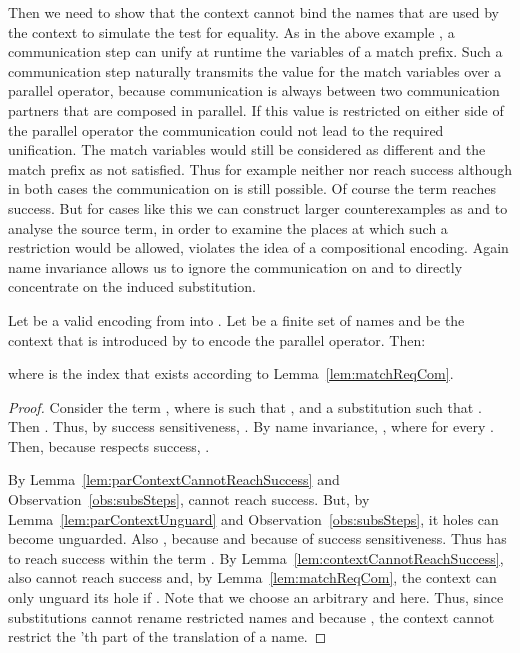 \documentclass[]{article}
\begin{document}
Then we need to show that the context  cannot bind the names that are used by the context  to simulate the test for equality. As in the above example , a communication step can unify at runtime the variables of a match prefix. Such a communication step naturally transmits the value for the match variables over a parallel operator, because communication is always between two communication partners that are composed in parallel. If this value is restricted on either side of the parallel operator the communication could not lead to the required unification. The match variables would still be considered as different and the match prefix as not satisfied. Thus for example neither  nor  reach success although in both cases the communication on  is still possible. Of course the term  reaches success. But for cases like this we can construct larger counterexamples as  and to analyse the source term, in order to examine the places at which such a restriction would be allowed, violates the idea of a compositional encoding. Again name invariance allows us to ignore the communication on  and to directly concentrate on the induced substitution.

\begin{lemma}
	\label{lem:parContextNotRes}
	Let \encod be a valid encoding from \piT into \piNM.
	Let  be a finite set of names
	and  be the context that is introduced by  to encode the parallel operator.
	Then:
	
	where  is the index that exists according to Lemma~\ref{lem:matchReqCom}.
\end{lemma}

\begin{proof}
	Consider the term , where  is such that , and a substitution  such that .
	Then . Thus, by success sensitiveness, .
	By name invariance, , where  for every .
	Then, because  respects success, .
	
	By Lemma~\ref{lem:parContextCannotReachSuccess} and Observation~\ref{obs:subsSteps},  cannot reach success. But, by Lemma~\ref{lem:parContextUnguard} and Observation~\ref{obs:subsSteps}, it holes can become unguarded. Also , because  and because of success sensitiveness.
	Thus  has to reach success within the term .
	By Lemma~\ref{lem:contextCannotReachSuccess}, also  cannot reach success and, by Lemma~\ref{lem:matchReqCom}, the context  can only unguard its hole if . Note that we choose an arbitrary  and  here. Thus, since substitutions cannot rename restricted names and because , the context  cannot restrict the 'th part of the translation of a name.
\end{proof}
\end{document}
